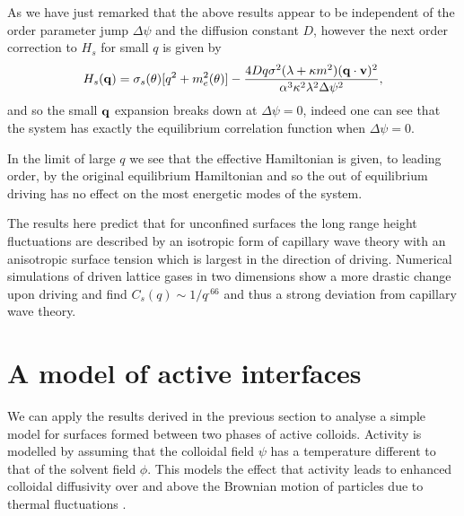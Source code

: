 As we have just remarked  that the above results appear to be independent of the order parameter jump $\Delta \psi$ and the diffusion constant $D$, however the next order correction to $H_s$ for small $q$ is given by
\begin{equation}
    H_s({\bf q}) = \sigma_s(\theta) [q^2 + m^2_e(\theta)] - \frac{4Dq \sigma^2(\lambda+\kappa m^2)( {\bf q}\cdot{\bf v})^2 }{\alpha^3 \kappa^2 \lambda^2 \Delta\psi^2},
\end{equation}
and so the small ${\bf q}$ expansion  breaks down at $\Delta\psi=0$, indeed one can see that the system has exactly the equilibrium correlation function when  $\Delta\psi=0$. 

In the limit of large $q$ we see that the effective Hamiltonian is given, to leading order, by the original equilibrium Hamiltonian and so the out of equilibrium driving has no effect on the most energetic modes of the system.

The results here predict that for unconfined surfaces the long range height fluctuations are described by an isotropic form of capillary wave theory with 
an anisotropic surface tension which is largest in the direction of driving. Numerical simulations of driven lattice gases in two dimensions \cite{leun1993} show a more drastic change upon driving and find $C_s(q)\sim  1/q^{.66}$ and thus a strong deviation from capillary wave theory.  

    \section{A model of active interfaces}

We can apply the results derived in the previous section to analyse a simple model for
surfaces formed between two phases of active colloids. Activity is modelled by assuming that the colloidal field $\psi$ has a temperature different to that of  the solvent field $\phi$. This models the effect that activity leads to enhanced colloidal diffusivity over and
above the Brownian motion of particles due to thermal fluctuations \cite{gros2015}.

